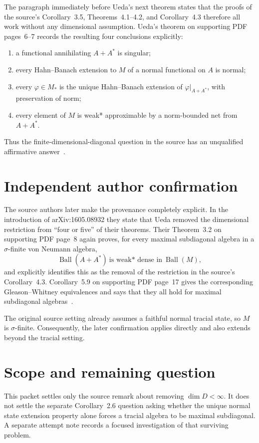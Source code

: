 \documentclass[11pt]{article}
\begin{document}
The paragraph immediately before Ueda's next theorem states that the proofs
of the source's Corollary~3.5, Theorems~4.1--4.2, and Corollary~4.3 therefore
all work without any dimensional assumption.  Ueda's theorem on supporting
PDF pages~6--7 records the resulting four conclusions explicitly:
\begin{enumerate}
 \item a functional annihilating $A+A^*$ is singular;
 \item every Hahn--Banach extension to $M$ of a normal functional on $A$ is
 normal;
 \item every $\varphi\in M_*$ is the unique Hahn--Banach extension of
 $\varphi|_{A+A^*}$, with preservation of norm;
 \item every element of $M$ is weak* approximable by a norm-bounded net from
 $A+A^*$.
\end{enumerate}
Thus the finite-dimensional-diagonal question in the source has an
unqualified affirmative answer~\cite{ueda}.

\section*{Independent author confirmation}

The source authors later make the provenance completely explicit.  In the
introduction of arXiv:1605.08932 they state that Ueda removed the dimensional
restriction from ``four or five'' of their theorems.  Their Theorem~3.2 on
supporting PDF page~8 again proves, for every maximal subdiagonal algebra in a
$\sigma$-finite von Neumann algebra,
\[
 \operatorname{Ball}(A+A^*)
 \ \text{is weak* dense in}\ 
 \operatorname{Ball}(M),
\]
and explicitly identifies this as the removal of the restriction in the
source's Corollary~4.3.  Corollary~5.9 on supporting PDF page~17 gives the
corresponding Gleason--Whitney equivalences and says that they all hold for
maximal subdiagonal algebras~\cite{confirmation}.

The original source setting already assumes a faithful normal tracial state,
so $M$ is $\sigma$-finite.  Consequently, the later confirmation applies
directly and also extends beyond the tracial setting.

\section*{Scope and remaining question}

This packet settles only the source remark about removing $\dim D<\infty$.
It does not settle the separate Corollary~2.6 question asking whether the
unique normal state extension property alone forces a tracial algebra to be
maximal subdiagonal.  A separate attempt note records a focused investigation
of that surviving problem.
\end{document}
